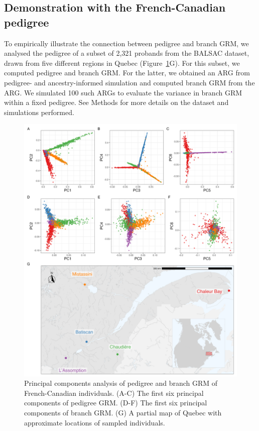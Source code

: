
\subsection{Demonstration with the French-Canadian pedigree}

To empirically illustrate the connection between pedigree and branch GRM,
we analysed the pedigree of a subset of 2,321 probands from the BALSAC dataset,
drawn from five different regions in Quebec (Figure~\ref{fig:PCA_map}G).
%
For this subset, we computed pedigree and branch GRM.
%
For the latter, we obtained an ARG from pedigree- and ancestry-informed simulation
and computed branch GRM from the ARG.
%
We simulated 100 such ARGs to evaluate the variance in branch GRM within a fixed pedigree.
See Methods for more details on the dataset and simulations performed.


\begin{figure}
    \centering
    \includegraphics[width = \textwidth]{Figures/map_and_pca_grid4.jpg}
    \caption{Principal components analysis of pedigree and branch GRM of French-Canadian individuals.
    (A-C) The first six principal components of pedigree GRM.
    (D-F) The first six principal components of branch GRM.
    (G) A partial map of Quebec with approximate locations of sampled individuals. \label{fig:PCA_map}}
\end{figure}

